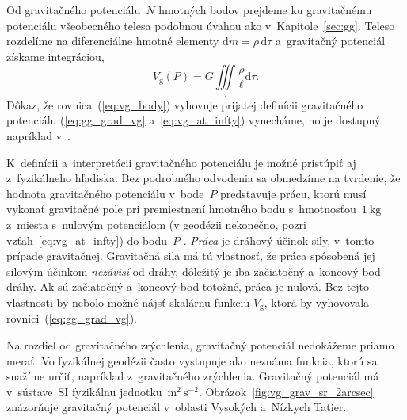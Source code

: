 \documentclass[a4paper, 12pt]{book}
\newcommand{\diff}{\mathrm d}
\newcommand{\gidx}{\mathrm g}
\begin{document}
Od gravitačného potenciálu~$N$ hmotných bodov prejdeme ku
gravitačnému potenciálu všeobecného telesa podobnou úvahou ako
v~Kapitole~\ref{sec:gg}.  Teleso rozdelíme na diferenciálne hmotné elementy
$\diff m = \rho \, \diff \tau$ a~gravitačný potenciál získame integráciou,
%
\begin{equation}
\label{eq:vg_body}
V_\gidx(P) = G \iiint\limits_{\tau} \frac{\rho}{\ell} \diff\tau{.}
\end{equation}
%
Dôkaz, že rovnica~(\ref{eq:vg_body}) vyhovuje prijatej definícii gravitačného
potenciálu (\ref{eq:gg_grad_vg} a~\ref{eq:vg_at_infty}) vynecháme, no je
dostupný napríklad v~\textcite{MacMillan1930}.

K~definícii a~interpretácii gravitačného potenciálu je možné pristúpiť aj 
z~fyzikálneho hľadiska.  Bez podrobného odvodenia sa obmedzíme na tvrdenie, že 
hodnota gravitačného potenciálu v~bode~$P$ predstavuje prácu, ktorú musí 
vykonať gravitačné pole pri premiestnení hmotného bodu s~hmotnosťou~$1\ 
\mathrm{kg}$ z~miesta s~nulovým potenciálom (v geodézii nekonečno, pozri 
vzťah~\ref{eq:vg_at_infty}) do bodu~$P$ 
\parencite{MacMillan1930,Kellogg1967,TorgeGeodesy}.  \emph{Práca} je dráhový 
účinok sily, v~tomto prípade gravitačnej.  Gravitačná sila má tú vlastnosť, že 
práca spôsobená jej silovým účinkom \emph{nezávisí} od dráhy, dôležitý je iba 
začiatočný a~koncový bod dráhy.  Ak sú začiatočný a~koncový bod totožné, práca 
je nulová.  Bez tejto vlastnosti by nebolo možné nájsť skalárnu funkciu 
$V_\gidx$, ktorá by vyhovovala rovnici~(\ref{eq:gg_grad_vg}).

Na rozdiel od gravitačného zrýchlenia, gravitačný potenciál nedokážeme
priamo merať.  Vo fyzikálnej geodézii často vystupuje ako neznáma funkcia,
ktorú sa snažíme určiť, napríklad z~gravitačného zrýchlenia.  Gravitačný 
potenciál má v~sústave~SI fyzikálnu jednotku~$\mathrm{m}^2\ \mathrm{s}^{-2}$.
Obrázok~\ref{fig:vg_grav_sr_2arcsec} znázorňuje gravitačný potenciál v~oblasti 
Vysokých a~Nízkych Tatier.
\end{document}
